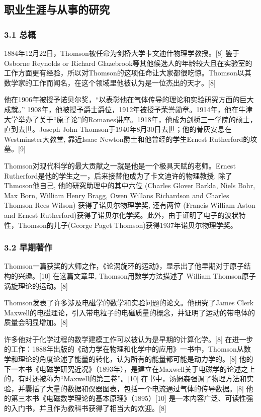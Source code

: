 \subsection{职业生涯与从事的研究}
\subsubsection{3.1 总概}
1884年12月22日，Thomson被任命为剑桥大学卡文迪什物理学教授。[8] 鉴于Osborne Reynolds or Richard Glazebrook等其他候选人的年龄较大且在实验室的工作方面更有经验，所以对Thomson的这项任命让大家都很吃惊。Thomson以其数学家的工作而闻名，在这个领域里他被认为是一位杰出的天才。[8]

他在1906年被授予诺贝尔奖，“以表彰他在气体传导的理论和实验研究方面的巨大成就。” 1908年，他被授予爵士爵位，1912年被授予荣誉勋章。1914年，他在牛津大学举办了关于“原子论”的Romanes讲座。1918年，他成为剑桥三一学院的硕士，直到去世。Joseph John Thomson于1940年8月30日去世；他的骨灰安息在Westminster大教堂, 靠近Isaac Newton爵士和他曾经的学生Ernest Rutherford的坟墓。[9]

Thomson对现代科学的最大贡献之一就是他是一个极具天赋的老师。Ernest Rutherford是他的学生之一，后来接替他成为了卡文迪许的物理教授. 除了Thmoson他自己, 他的研究助理中的其中六位 (Charles Glover Barkla, Niels Bohr, Max Born, William Henry Bragg, Owen Willans Richardson and Charles Thomson Rees Wilson) 获得了诺贝尔物理学奖, 还有两位 (Francis William Aston and Ernest Rutherford)获得了诺贝尔化学奖。此外，由于证明了电子的波状特性，Thomson的儿子(George Paget Thomson)获得1937年诺贝尔物理学奖。

\subsubsection{3.2 早期著作}
Thomson一篇获奖的大师之作，《论涡旋环的运动》，显示出了他早期对于原子结构的兴趣。[10] 在这篇文章里, Thomson用数学方法描述了 William Thomson原子涡旋理论的运动。[8]

Thomson发表了许多涉及电磁学的数学和实验问题的论文。他研究了James Clerk Maxwell的电磁理论，引入带电粒子的电磁质量的概念，并证明了运动的带电体的质量会明显增加。[8]

许多他对于化学过程的数学建模工作可以被认为是早期的计算化学。[8] 在进一步的工作：1888年出版的《动力学在物理和化学中的应用》一书中，Thomson从数学和理论的角度论述了能量的转化，认为所有的能量都可能是动力学的。[8] 他的下一本书《电磁学研究近况》（1893年），是建立在Maxwell关于电磁学的论述之上的，有时还被称为“Maxwell的第三卷”。[10] 在书中，汤姆森强调了物理方法和实验，并囊括了大量的数据和仪器图表，包括一个电流通过气体的传导数据。[8] 他的第三本书《电磁数学理论的基本原理》（1895）[10] 是一本内容广泛、可读性强的入门书，并且作为教科书获得了相当大的欢迎。[8]

